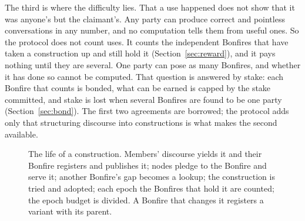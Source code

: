 The third is where the difficulty lies. That a use happened does not show that it was anyone's but the
claimant's. Any party can produce correct and pointless conversations in any number, and no computation tells them
from useful ones. So the protocol does not count uses. It counts the independent Bonfires that have taken a
construction up and still hold it (Section~\ref{sec:reward}), and it pays nothing until they are several. One party
can pose as many Bonfires, and whether it has done so cannot be computed. That question is answered by stake: each
Bonfire that counts is bonded, what can be earned is capped by the stake committed, and stake is lost when several
Bonfires are found to be one party (Section~\ref{sec:bond}). The first two agreements are borrowed; the protocol
adds only that structuring discourse into constructions is what makes the second available.

\begin{figure}[!htb]
\centering

\caption{The life of a construction. Members' discourse yields it and their Bonfire registers and publishes it;
nodes pledge to the Bonfire and serve it; another Bonfire's gap becomes a lookup; the construction is tried and
adopted; each epoch the Bonfires that hold it are counted; the epoch budget is divided. A Bonfire that changes it
registers a variant with its parent.}\label{fig:life}
\end{figure}
